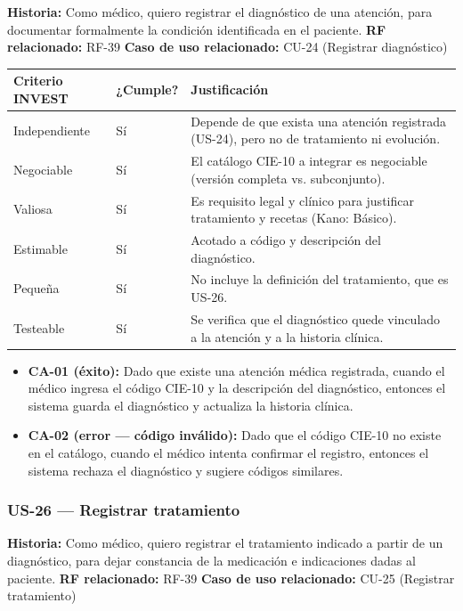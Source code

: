 \documentclass[11pt,a4paper]{article}
\providecommand{\tightlist}{%
	\setlength{\itemsep}{0pt}\setlength{\parskip}{0pt}}
\begin{document}
	\textbf{Historia:} Como médico, quiero registrar el diagnóstico de una atención, para documentar formalmente la condición identificada en el paciente.
	\textbf{RF relacionado:} RF-39
	\textbf{Caso de uso relacionado:} CU-24 (Registrar diagnóstico)
	
	\begin{longtable}{p{} p{} p{}}
		\toprule
		\textbf{Criterio INVEST} & \textbf{¿Cumple?} & \textbf{Justificación} \\
		\midrule
		\endhead
		Independiente & Sí & Depende de que exista una atención registrada (US-24), pero no de tratamiento ni evolución. \\
		Negociable & Sí & El catálogo CIE-10 a integrar es negociable (versión completa vs. subconjunto). \\
		Valiosa & Sí & Es requisito legal y clínico para justificar tratamiento y recetas (Kano: Básico). \\
		Estimable & Sí & Acotado a código y descripción del diagnóstico. \\
		Pequeña & Sí & No incluye la definición del tratamiento, que es US-26. \\
		Testeable & Sí & Se verifica que el diagnóstico quede vinculado a la atención y a la historia clínica. \\
		\bottomrule
	\end{longtable}
	
	\begin{itemize}
		\tightlist
		\item \textbf{CA-01 (éxito):} Dado que existe una atención médica registrada, cuando el médico ingresa el código CIE-10 y la descripción del diagnóstico, entonces el sistema guarda el diagnóstico y actualiza la historia clínica.
		\item \textbf{CA-02 (error --- código inválido):} Dado que el código CIE-10 no existe en el catálogo, cuando el médico intenta confirmar el registro, entonces el sistema rechaza el diagnóstico y sugiere códigos similares.
	\end{itemize}
	
	\subsubsection{US-26 --- Registrar tratamiento}
	
	\textbf{Historia:} Como médico, quiero registrar el tratamiento indicado a partir de un diagnóstico, para dejar constancia de la medicación e indicaciones dadas al paciente.
	\textbf{RF relacionado:} RF-39
	\textbf{Caso de uso relacionado:} CU-25 (Registrar tratamiento)
	
\end{document}
